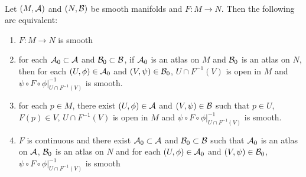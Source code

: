 \documentclass{book}
\begin{document}
\begin{ex}   \\
	Let $(M, \mathcal{A})$ and $(N, \mathcal{B})$ be smooth manifolds and $F: M \rightarrow N$. Then the following are equivalent:
	\begin{enumerate}
		\item $F:M \rightarrow N$ is smooth
		\item for each $\mathcal{A}_0 \subset \mathcal{A}$ and $\mathcal{B}_0 \subset \mathcal{B}$, if $\mathcal{A}_0$ is an atlas on $M$ and $\mathcal{B}_0$ is an atlas on $N$, then for each $(U, \phi) \in \mathcal{A}_0$ and $(V, \psi) \in \mathcal{B}_0$, $U \cap F^{-1}(V)$ is open in $M$ and $\psi \circ F \circ \phi|_{U \cap F^{-1}(V)}^{-1}$ is smooth.
		\item for each $p \in M$, there exist $(U, \phi) \in \mathcal{A}$ and $(V, \psi) \in \mathcal{B}$ such that $p \in U$, $F(p) \in V$, $U \cap F^{-1}(V)$ is open in $M$ and $\psi \circ F \circ \phi|_{U \cap F^{-1}(V)}^{-1}$ is smooth. 
		\item $F$ is continuous and there exist $\mathcal{A}_0 \subset \mathcal{A}$ and $\mathcal{B}_0 \subset \mathcal{B}$ such that $\mathcal{A}_0$ is an atlas on $\mathcal{A}$, $\mathcal{B}_0$ is an atlas on $N$ and for each $(U, \phi) \in \mathcal{A}_0$ and $(V, \psi) \in \mathcal{B}_0$, $\psi \circ F \circ \phi|_{U \cap F^{-1}(V)}^{-1}$ is smooth 
	\end{enumerate}
\end{ex}
\end{document}
